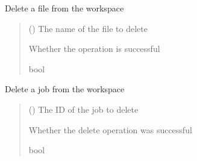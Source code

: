 \documentclass[letterpaper,10pt,english]{sphinxmanual}
\begin{document}
\begin{fulllineitems}
\begin{fulllineitems}
\label{\detokenize{aisquared.platform:aisquared.platform.DatabricksClient.DatabricksClient.delete_from_workspace}}
\pysigstartsignatures
{}
\pysigstopsignatures
\sphinxAtStartPar
Delete a file from the workspace
\begin{quote}\begin{description}
\sphinxAtStartPar
{} () \textendash{} The name of the file to delete

\sphinxAtStartPar
{} \textendash{} Whether the operation is successful

\sphinxAtStartPar
bool

\end{description}\end{quote}

\end{fulllineitems}


\begin{fulllineitems}
\label{\detokenize{aisquared.platform:aisquared.platform.DatabricksClient.DatabricksClient.delete_job}}
\pysigstartsignatures
{}
\pysigstopsignatures
\sphinxAtStartPar
Delete a job from the workspace
\begin{quote}\begin{description}
\sphinxAtStartPar
{} () \textendash{} The ID of the job to delete

\sphinxAtStartPar
{} \textendash{} Whether the delete operation was successful

\sphinxAtStartPar
bool


\end{description}
\end{quote}
\end{fulllineitems}
\end{fulllineitems}
\end{document}
